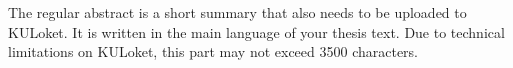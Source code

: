 The regular abstract is a short summary that also needs to be uploaded to KULoket. It is written in the main language of your thesis text. Due to technical limitations on KULoket, this part may not exceed 3500 characters.\par

\lipsum[5]